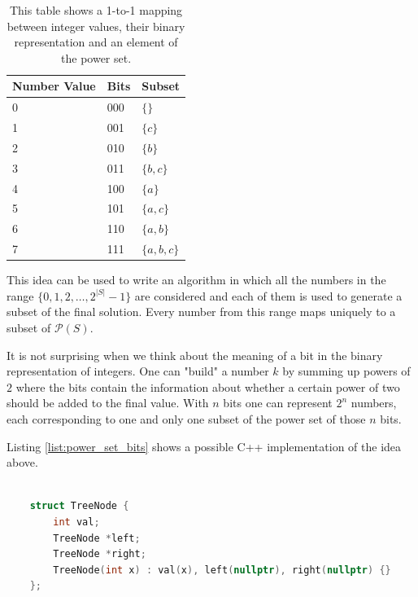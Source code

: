 \begin{table}
    \centering
    \begin{tabular}{|l|l|l|}
        \hline
        Number Value & Bits & Subset\\ \hline
        0     & 000  & $\{\}$\\ \hline
        1     & 001  & $\{c\}$\\ \hline
        2     & 010  & $\{b\}$\\ \hline
        3     & 011  & $\{b,c\}$\\ \hline
        4     & 100  & $\{a\}$\\ \hline
        5     & 101  & $\{a,c\}$\\ \hline
        6     & 110  & $\{a,b\}$\\ \hline
        7     & 111  & $\{a,b,c\}$ \\ \hline
    \end{tabular}
    \caption[Mapping between bits and element of the power set.]{This table shows a 1-to-1 mapping between integer values, their binary representation and an element of the power set.}
    \label{tab:mapping_value_bits}
\end{table}


This idea can be used to write an algorithm in which all the numbers in the range $\{0,1,2,\ldots,
2^{|S|}-1\}$ are considered and each of them is used to generate a subset of the final solution.
Every number from this range maps uniquely to a subset of $\mathcal{P}(S)$. 

It is not
surprising when we think about the meaning of a bit in the binary representation of integers. One
can "build" a number $k$ by summing up powers of $2$ where the bits contain the information about whether a
certain power of two should be added to the final value. With $n$
bits one can represent $2^n$ numbers, each corresponding to one and only one subset of the power set of those $n$ bits.


Listing \ref{list:power_set_bits} shows  a possible C++ implementation of the idea above.


\begin{lstlisting}[language=c++, caption=Binary tree definition used in this exercice.,label=list:verify_BST:tree_structure]

    struct TreeNode {
        int val;
        TreeNode *left;
        TreeNode *right;
        TreeNode(int x) : val(x), left(nullptr), right(nullptr) {}
    };
    \end{lstlisting}


